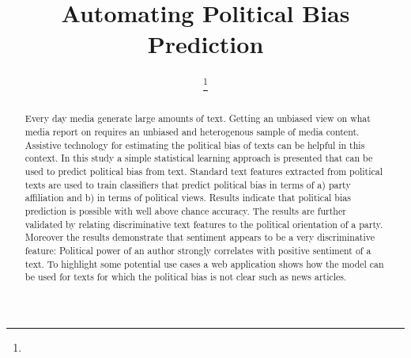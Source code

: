 \documentclass[runningheads,a4paper]{llncs}
\begin{document}
\mainmatter  %

\title{Automating Political Bias Prediction}


%
%
\author{
\thanks{}
%
}


%
%

\tocauthor{}
\maketitle

\begin{abstract} 
Every day media generate large amounts of text. Getting an unbiased view on what media report on requires an unbiased and heterogenous sample of media content. Assistive technology for estimating the political bias of texts can be helpful in this context. In this study a simple statistical learning approach is presented that can be used to predict political bias from text. Standard text features extracted from political texts are used to train classifiers that predict political bias in terms of a) party affiliation and b) in terms of political views. Results indicate that political bias prediction is possible with well above chance accuracy. The results are further validated by relating discriminative text features to the political orientation of a party. Moreover the results demonstrate that sentiment appears to be a very discriminative feature: Political power of an author strongly correlates with positive sentiment of a text. To highlight some potential use cases a web application shows how the model can be used for texts for which the political bias is not clear such as news articles.
\end{abstract} 
\end{document}
